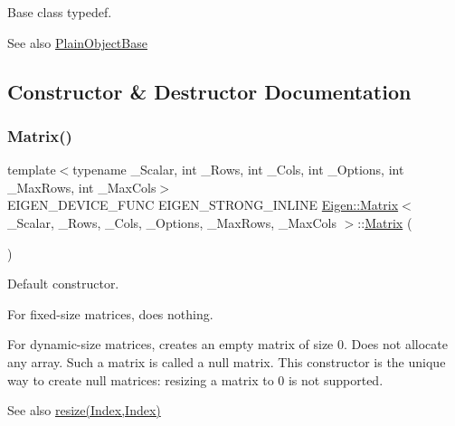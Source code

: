 Base class typedef. 

\begin{DoxySeeAlso}{See also}
\mbox{\hyperlink{class_eigen_1_1_plain_object_base}{Plain\+Object\+Base}} 
\end{DoxySeeAlso}


\subsection{Constructor \& Destructor Documentation}
\mbox{\label{class_eigen_1_1_matrix_a11f852d66fa55b2aed12aa22da807a6b}} 
\subsubsection{\texorpdfstring{Matrix()}{Matrix()}\hspace{0.1cm}{\footnotesize\ttfamily [1/3]}}
{\footnotesize\ttfamily template$<$typename \+\_\+\+Scalar, int \+\_\+\+Rows, int \+\_\+\+Cols, int \+\_\+\+Options, int \+\_\+\+Max\+Rows, int \+\_\+\+Max\+Cols$>$ \\
E\+I\+G\+E\+N\+\_\+\+D\+E\+V\+I\+C\+E\+\_\+\+F\+U\+NC E\+I\+G\+E\+N\+\_\+\+S\+T\+R\+O\+N\+G\+\_\+\+I\+N\+L\+I\+NE \mbox{\hyperlink{class_eigen_1_1_matrix}{Eigen\+::\+Matrix}}$<$ \+\_\+\+Scalar, \+\_\+\+Rows, \+\_\+\+Cols, \+\_\+\+Options, \+\_\+\+Max\+Rows, \+\_\+\+Max\+Cols $>$\+::\mbox{\hyperlink{class_eigen_1_1_matrix}{Matrix}} (\begin{DoxyParamCaption}{ }\end{DoxyParamCaption})\hspace{0.3cm}{\ttfamily [inline]}}



Default constructor. 

For fixed-\/size matrices, does nothing.

For dynamic-\/size matrices, creates an empty matrix of size 0. Does not allocate any array. Such a matrix is called a null matrix. This constructor is the unique way to create null matrices\+: resizing a matrix to 0 is not supported.

\begin{DoxySeeAlso}{See also}
\mbox{\hyperlink{class_eigen_1_1_plain_object_base_a99d9054ee2d5a40c6e00ded0265e9cea}{resize(\+Index,\+Index)}} 
\end{DoxySeeAlso}
\mbox{\label{class_eigen_1_1_matrix_ae4bcda7578de9624709cbfa8d3ddd9d9}} 
